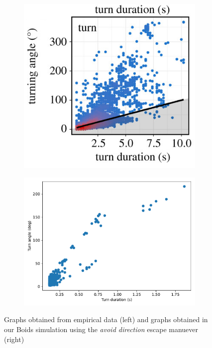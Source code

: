 \documentclass[9pt]{pnas-new}
\begin{document}
\begin{figure}[h]
\begin{subfigure}[t]{.45\textwidth}
        \centering
        \includegraphics[width=0.8\linewidth]{empirical_turn_dur.png}
    \end{subfigure}
    \hspace{.5cm} %
    \begin{subfigure}[t]{.45\textwidth}
        \centering
        \includegraphics[width=1.02\linewidth]{avoid_direction_attack_peripheral/turn_angle_dur_2008.pdf}
    \end{subfigure}
    \caption{Graphs obtained from empirical data (left) and graphs obtained in our Boids simulation using the \textit{avoid direction} escape manuever (right)}
    \label{fig:empirial_comparison}
\end{figure}
\end{document}
